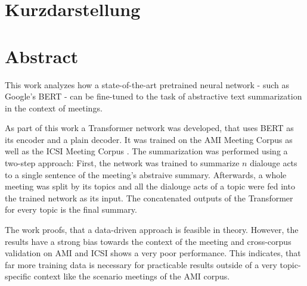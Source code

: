 \thispagestyle{empty}
\section*{Kurzdarstellung}
\label{sec:kurzdarstellung}

\blindtext


\section*{Abstract}
\label{sec:abstract}

This work analyzes how a state-of-the-art pretrained neural network - such as Google's BERT \cite{devlin2018bert} - can be fine-tuned to the task of abstractive text summarization in the context of meetings.

As part of this work a Transformer network \cite{1706.03762} was developed, that uses BERT as its encoder and a plain decoder.
It was trained on the AMI Meeting Corpus \cite{Mccowan05theami} as well as the ICSI Meeting Corpus \cite{Janin}.
The summarization was performed using a two-step approach:
First, the network was trained to summarize \(n\) dialouge acts to a single sentence of the meeting's abstraive summary.
Afterwards, a whole meeting was split by its topics and all the dialouge acts of a topic were fed into the trained network as its input.
The concatenated outputs of the Transformer for every topic is the final summary.

The work proofs, that a data-driven approach is feasible in theory.
However, the results have a strong bias towards the context of the meeting and cross-corpus validation on AMI and ICSI shows a very poor performance.
This indicates, that far more training data is necessary for practicable results outside of a very topic-specific context like the scenario meetings of the AMI corpus. 